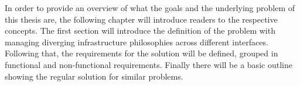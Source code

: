 In order to provide an overview of what the goals and the underlying problem of this thesis are, the following chapter will introduce readers to the respective concepts.
The first section will introduce the definition of the problem with managing diverging infrastructure philosophies across different interfaces.
Following that, the requirements for the solution will be defined, grouped in functional and non-functional requirements.
Finally there will be a basic outline showing the regular solution for similar problems.
